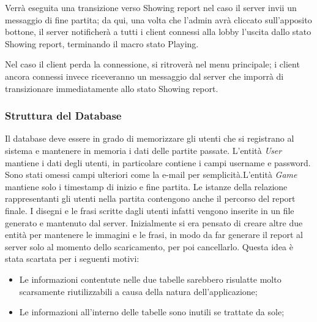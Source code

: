 \noindent Verrà eseguita una transizione verso Showing report nel caso il server invii un messaggio di fine partita; da qui, una volta che l'admin avrà cliccato sull'apposito bottone, il server notificherà a tutti i client connessi alla lobby l'uscita dallo stato Showing report, terminando il macro stato Playing.\newline

\noindent Nel caso il client perda la connessione, si ritroverà nel menu principale; i client ancora connessi invece riceveranno un messaggio dal server che imporrà di transizionare immediatamente allo stato Showing report.\newline

\subsubsection{Struttura del Database}
Il database deve essere in grado di memorizzare gli utenti che si registrano al sistema e mantenere in memoria i dati delle partite passate.\newline
L'entità \textit{User} mantiene i dati degli utenti, in particolare contiene i campi username e password. Sono stati omessi campi ulteriori come la e-mail per semplicità.\newline L'entità \textit{Game} mantiene solo i timestamp di inizio e fine partita.\newline
Le istanze della relazione rappresentanti gli utenti nella partita contengono anche il percorso del report finale.\newline
I disegni e le frasi scritte dagli utenti infatti vengono inserite in un file generato e mantenuto dal server.\newline
Inizialmente si era pensato di creare altre due entità per mantenere le immagini e le frasi, in modo da far generare il report al server solo al momento dello scaricamento, per poi cancellarlo.\newline
Questa idea è stata scartata per i seguenti motivi:
\begin{itemize}
    \item Le informazioni contentute nelle due tabelle sarebbero risulatte molto scarsamente riutilizzabili a causa della natura dell'applicazione;
    \item Le informazioni all'interno delle tabelle sono inutili se trattate da sole;
\end{itemize}
